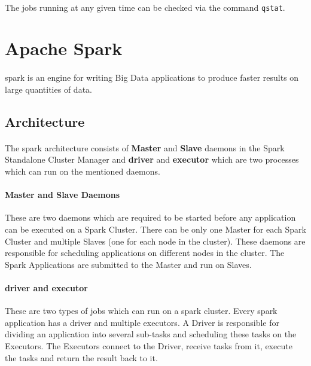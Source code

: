 \paragraph{} The jobs running at any given time can be checked via the command
\texttt{qstat}.



\newpage{}
\section{Apache Spark} \label{sec:appendix-spark}

\paragraph{} \gls{spark} is an engine for writing Big Data applications to
produce faster results on large quantities of data.


\subsection{Architecture}

\paragraph{} The \gls{spark} architecture consists of \textbf{Master} and
\textbf{Slave} daemons in the Spark Standalone Cluster Manager and
\textbf{\gls{driver}} and \textbf{\gls{executor}} which are two processes which
can run on the mentioned daemons.

\paragraph{Master and Slave Daemons} These are two daemons which are required to
be started before any application can be executed on a Spark Cluster. There can
be only one Master for each Spark Cluster and multiple Slaves (one for each node
in the cluster). These daemons are responsible for scheduling applications on
different nodes in the cluster. The Spark Applications are submitted to the
Master and run on Slaves.

\paragraph{\gls{driver} and \gls{executor}} These are two types of jobs which
can run on a \gls{spark} cluster. Every \gls{spark} application has a
\gls{driver} and multiple \glspl{executor}. A Driver is responsible for dividing
an application into several sub-tasks and scheduling these tasks on the
Executors. The Executors connect to the Driver, receive tasks from it, execute
the tasks and return the result back to it.


